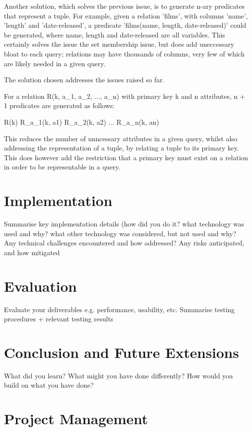 \documentclass[a4wide, 11pt]{article}
\begin{document}
Another solution, which solves the previous issue, is to generate n-ary predicates
that represent a tuple. For example, given a relation 'films', with columns
'name', 'length' and 'date-released', a predicate 'films(name, length,
date-released)' could be generated, where name, length and date-released are
all variables. This certainly solves the issue the set membership issue, but
does add uneccessary bloat to each query; relations may have thousands of
columns, very few of which are likely needed in a given query.

The solution chosen addresses the issues raised so far.

For a relation R(k, a_{1}, a_{2}, ..., a_{n}) with primary key k and n
attributes, n + 1 predicates are generated as follows:

R(k)
R\_a_{1}(k, a1)
R\_a_{2}(k, a2)
...
R\_a_{n}(k, an)

This reduces the number of unncessary attributes in a given query, whilst also
addressing the representation of a tuple, by relating a tuple to its primary
key. This does however add the restriction that a primary key must exist on a
relation in order to be representable in a query.

\section{Implementation}

        Summarise key implementation details (how did you do it? what technology was used and why? what other technology was considered, but not used and why?
        Any technical challenges encountered and how addressed?
        Any risks anticipated, and how mitigated 

\section{Evaluation}

        Evaluate your deliverables e.g. performance, usability, etc.
        Summarise testing procedures + relevant testing results 

\section{Conclusion and Future Extensions}

        What did you learn? What might you have done differently?
        How would you build on what you have done? 

\section{Project Management}
\end{document}
